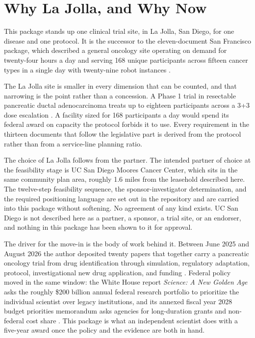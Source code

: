 
\section{Why La Jolla, and Why Now}

This package stands up one clinical trial site, in La Jolla, San Diego, for one
disease and one protocol. It is the successor to the eleven-document San
Francisco package, which described a general oncology site operating on demand
for twenty-four hours a day and serving 168 unique participants across fifteen
cancer types in a single day with twenty-nine robot instances
\cite{sfsite2026,newtrial2026}.

The La Jolla site is smaller in every dimension that can be counted, and that
narrowing is the point rather than a concession. A Phase 1 trial in resectable
pancreatic ductal adenocarcinoma treats up to eighteen participants across a
3+3 dose escalation \cite{phase1protocol}. A facility sized for 168 participants a
day would spend its federal award on capacity the protocol forbids it to use.
Every requirement in the thirteen documents that follow the legislative part is
derived from the protocol rather than from a service-line planning ratio.

The choice of La Jolla follows from the partner. The intended partner of choice
at the feasibility stage is UC San Diego Moores Cancer Center, which sits in the
same community plan area, roughly 1.6 miles from the leasehold described here.
The twelve-step feasibility sequence, the sponsor-investigator determination, and
the required positioning language are set out in the repository and are carried
into this package without softening. No agreement of any kind exists. UC San
Diego is not described here as a partner, a sponsor, a trial site, or an
endorser, and nothing in this package has been shown to it for approval.

The driver for the move-in is the body of work behind it. Between June 2025 and
August 2026 the author deposited twenty papers that together carry a pancreatic
oncology trial from drug identification through simulation, regulatory
adaptation, protocol, investigational new drug application, and funding
\cite{pdacdeck2026}. Federal policy moved in the same window: the White House
report \emph{Science: A New Golden Age} asks the roughly \$200 billion annual
federal research portfolio to prioritize the individual scientist over legacy
institutions, and its annexed fiscal year 2028 budget priorities memorandum asks
agencies for long-duration grants and non-federal cost share
\cite{kratsios2026sciencegoldenage,kratsiosvought2026fy2028priorities}. This
package is what an independent scientist does with a five-year award once the
policy and the evidence are both in hand.

